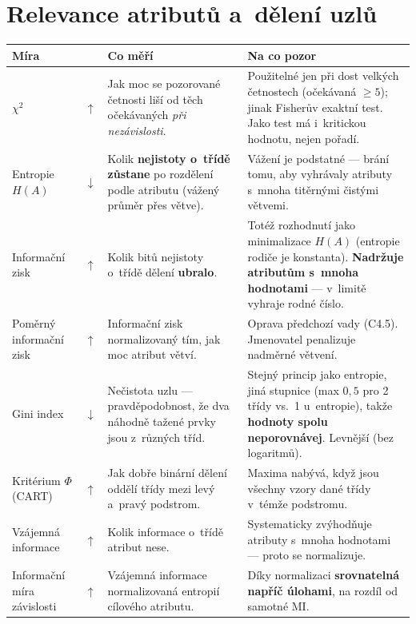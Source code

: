 \documentclass[11pt,a4paper]{article}
\makeatletter
\newcommand{\up}{\textcolor{upcol}{$\boldsymbol{\uparrow}$}}
\newcommand{\down}{\textcolor{downcol}{$\boldsymbol{\downarrow}$}}
\newenvironment{mirytab}{%
  \par\medskip\noindent\small
  \begin{tabular}{@{}>{\raggedright\arraybackslash}p{3.15cm}
                    >{\centering\arraybackslash}p{0.85cm}
                    >{\raggedright\arraybackslash}p{5.3cm}
                    >{\raggedright\arraybackslash}p{6.1cm}@{}}
  \toprule
  \textbf{Míra} & & \textbf{Co měří} & \textbf{Na co pozor} \\
  \midrule}%
  {\bottomrule\end{tabular}\par\medskip}
\makeatother
\begin{document}
\section{Relevance atributů a~dělení uzlů}

\begin{mirytab}
$\chi^2$ & \up &
Jak moc se pozorované četnosti liší od těch očekávaných \emph{při nezávislosti}. &
Použitelné jen při dost velkých četnostech (očekávaná $\ge 5$); jinak Fisherův exaktní
test. Jako test má i~kritickou hodnotu, nejen pořadí. \\[2pt]

Entropie $H(A)$ & \down &
Kolik \textbf{nejistoty o~třídě zůstane} po rozdělení podle atributu (vážený průměr
přes větve). &
Vážení je podstatné --- brání tomu, aby vyhrávaly atributy s~mnoha titěrnými čistými
větvemi. \\[2pt]

Informační zisk & \up &
Kolik bitů nejistoty o~třídě dělení \textbf{ubralo}. &
Totéž rozhodnutí jako minimalizace $H(A)$ (entropie rodiče je konstanta).
\textbf{Nadržuje atributům s~mnoha hodnotami} --- v~limitě vyhraje rodné číslo. \\[2pt]

Poměrný informační zisk & \up &
Informační zisk normalizovaný tím, jak moc atribut větví. &
Oprava předchozí vady (C4.5). Jmenovatel penalizuje nadměrné větvení. \\[2pt]

Gini index & \down &
Nečistota uzlu --- pravděpodobnost, že dva náhodně tažené prvky jsou z~různých tříd. &
Stejný princip jako entropie, jiná stupnice (max $0{,}5$ pro 2 třídy vs.\ 1 u~entropie),
takže \textbf{hodnoty spolu neporovnávej}. Levnější (bez logaritmů). \\[2pt]

Kritérium $\Phi$ (CART) & \up &
Jak dobře binární dělení oddělí třídy mezi levý a~pravý podstrom. &
Maxima nabývá, když jsou všechny vzory dané třídy v~témže podstromu. \\[2pt]

Vzájemná informace & \up &
Kolik informace o~třídě atribut nese. &
Systematicky zvýhodňuje atributy s~mnoha hodnotami --- proto se normalizuje. \\[2pt]

Informační míra závislosti & \up &
Vzájemná informace normalizovaná entropií cílového atributu. &
Díky normalizaci \textbf{srovnatelná napříč úlohami}, na rozdíl od samotné MI. \\[2pt]


\end{mirytab}
\end{document}
